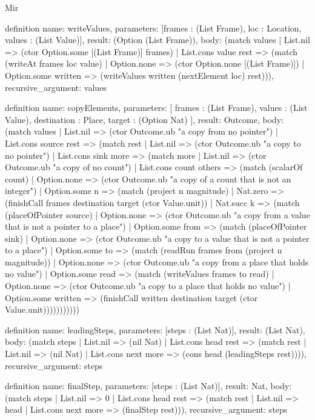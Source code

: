 \begin{lexlean}{Mir}
\begin{semanticmodule}
definition{
  name: writeValues,
  parameters: [frames : (List Frame), loc : Location, values : (List Value)],
  result: (Option (List Frame)),
  body: (match values
    | List.nil => (ctor Option.some [(List Frame)] frames)
    | List.cons value rest => (match (writeAt frames loc value)
      | Option.none => (ctor Option.none [(List Frame)])
      | Option.some written => (writeValues written (nextElement loc) rest))),
  recursive_argument: values
}

definition{
  name: copyElements,
  parameters: [
    frames : (List Frame),
    values : (List Value),
    destination : Place,
    target : (Option Nat)
  ],
  result: Outcome,
  body: (match values
    | List.nil => (ctor Outcome.ub "a copy from no pointer")
    | List.cons source rest => (match rest
      | List.nil => (ctor Outcome.ub "a copy to no pointer")
      | List.cons sink more => (match more
        | List.nil => (ctor Outcome.ub "a copy of no count")
        | List.cons count others => (match (scalarOf count)
          | Option.none => (ctor Outcome.ub "a copy of a count that is not an integer")
          | Option.some n => (match (project n magnitude)
            | Nat.zero => (finishCall frames destination target (ctor Value.unit))
            | Nat.succ k => (match (placeOfPointer source)
              | Option.none => (ctor Outcome.ub "a copy from a value that is not a pointer to a place")
              | Option.some from => (match (placeOfPointer sink)
                | Option.none => (ctor Outcome.ub "a copy to a value that is not a pointer to a place")
                | Option.some to => (match (readRun frames from (project n magnitude))
                  | Option.none => (ctor Outcome.ub "a copy from a place that holds no value")
                  | Option.some read => (match (writeValues frames to read)
                    | Option.none => (ctor Outcome.ub "a copy to a place that holds no value")
                    | Option.some written => (finishCall written destination target (ctor Value.unit)))))))))))
}

definition{
  name: leadingSteps,
  parameters: [steps : (List Nat)],
  result: (List Nat),
  body: (match steps
    | List.nil => (nil Nat)
    | List.cons head rest => (match rest
      | List.nil => (nil Nat)
      | List.cons next more => (cons head (leadingSteps rest)))),
  recursive_argument: steps
}

definition{
  name: finalStep,
  parameters: [steps : (List Nat)],
  result: Nat,
  body: (match steps
    | List.nil => 0
    | List.cons head rest => (match rest
      | List.nil => head
      | List.cons next more => (finalStep rest))),
  recursive_argument: steps
}


\end{semanticmodule}
\end{lexlean}
